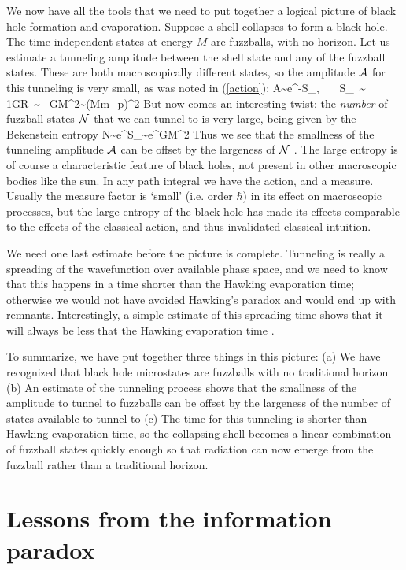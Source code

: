 \documentclass[12pt]{article}
\begin{document}
We now have all the  tools that we need to put together a logical picture of black hole formation and evaporation. Suppose a shell collapses to form a black hole. The time independent states at energy $M$ are fuzzballs, with no horizon. Let us estimate a tunneling amplitude between the shell state and any of the fuzzball states. These are both macroscopically different states, so the amplitude ${\cal A}$ for this tunneling is very small, as was noted in (\ref{action}):
\be
{\cal A}\sim  e^{-S_{}}, ~~~S_{}~\sim~ {1\pi G}\int R~\sim~ GM^2\sim ({M\over m_p})^2
 \label{actionq}
\ee
But now comes an interesting twist: the {\it number} of fuzzball states  ${\cal N}$ that we can tunnel to is very large, being given by the Bekenstein entropy
\be
{\cal N}\sim e^{S_{}}\sim e^{GM^2}
\ee
Thus we see that the smallness of the tunneling amplitude ${\cal A}$  can be offset by the largeness of ${\cal N}$ \cite{offset}. The large entropy is of course a characteristic feature of black holes, not present in other macroscopic bodies like the sun. In any path integral we have the action, and a measure. Usually the measure factor is `small' (i.e. order $\hbar$) in its effect on macroscopic processes, but the large entropy of the black hole has made its effects comparable to the effects of the classical action, and thus invalidated classical intuition. 

We need one last estimate before the picture is complete. Tunneling is really a spreading of the wavefunction over available phase space, and we need to know that this happens in a time shorter than the Hawking evaporation time; otherwise we would not have avoided Hawking's paradox and would end up with remnants. Interestingly, a simple estimate of this spreading time shows that it will always be less that the Hawking evaporation time \cite{release}. 


To summarize, we have put together three things in this picture: (a) We have recognized that black hole microstates are fuzzballs with no traditional horizon (b) An estimate of the tunneling process shows that the smallness of the amplitude to tunnel to fuzzballs can be offset by the largeness of the number of states available to tunnel to (c) The time for this tunneling is shorter than Hawking evaporation time, so the collapsing shell becomes a linear combination of fuzzball states quickly enough so that radiation can now emerge from the fuzzball rather than a traditional horizon. 


\section{Lessons from the information paradox}
\end{document}
